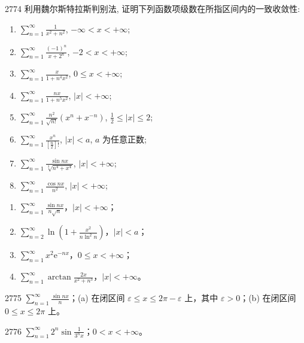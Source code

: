 \begin{prob}[L]{2774}
利用魏尔斯特拉斯判别法, 证明下列函数项级数在所指区间内的一致收敛性:
\begin{enumerate}[label=(\alph*), itemsep=2pt, topsep=3pt]
\item $\sum_{n=1}^{\infty} \frac{1}{x^2+n^2}$, $-\infty < x < +\infty$;
\item $\sum_{n=1}^{\infty} \frac{(-1)^n}{x+2^n}$, $-2 < x < +\infty$;
\item $\sum_{n=1}^{\infty} \frac{x}{1+n^4 x^2}$, $0 \leqslant x < +\infty$;
\item $\sum_{n=1}^{\infty} \frac{nx}{1+n^5 x^2}$, $|x| < +\infty$;
\item $\sum_{n=1}^{\infty} \frac{n^2}{\sqrt{n!}}(x^n+x^{-n})$, $\frac{1}{2} \leqslant |x| \leqslant 2$;
\item $\sum_{n=1}^{\infty} \frac{x^n}{\left[\frac{n}{2}\right]!}$, $|x| < a$, $a$ 为任意正数;
\item $\sum_{n=1}^{\infty} \frac{\sin nx}{\sqrt[3]{n^4+x^4}}$, $|x| < +\infty$;
\item $\sum_{n=1}^{\infty} \frac{\cos nx}{n^2}$, $|x| < +\infty$;
\end{enumerate}
\begin{enumerate}[label=(\alph*), start=9, itemsep=2pt, topsep=3pt]
  \item $\displaystyle\sum_{n=1}^{\infty} \frac{\sin nx}{n\sqrt{n}}$，$ |x| < +\infty $；
  \item $\displaystyle\sum_{n=2}^{\infty} \ln\left(1 + \frac{x^2}{n\ln^2 n}\right)$，$ |x| < a $；
  \item $\displaystyle\sum_{n=1}^{\infty} x^2 \mathrm{e}^{-nx}$，$ 0 \leqslant x < +\infty $；
  \item $\displaystyle\sum_{n=1}^{\infty} \arctan\frac{2x}{x^2+n^3}$，$ |x| < +\infty $。
\end{enumerate}
\end{prob}


\begin{prob}[M]{2775}
$\displaystyle\sum_{n=1}^{\infty} \frac{\sin nx}{n}$；(a) 在闭区间 $\varepsilon \leqslant x \leqslant 2\pi - \varepsilon$ 上，其中 $\varepsilon > 0$；(b) 在闭区间 $0 \leqslant x \leqslant 2\pi$ 上。
\end{prob}

\begin{prob}[S]{2776}
$\displaystyle\sum_{n=1}^{\infty} 2^n \sin\frac{1}{3^n x}$；$0 < x < +\infty$。
\end{prob}

